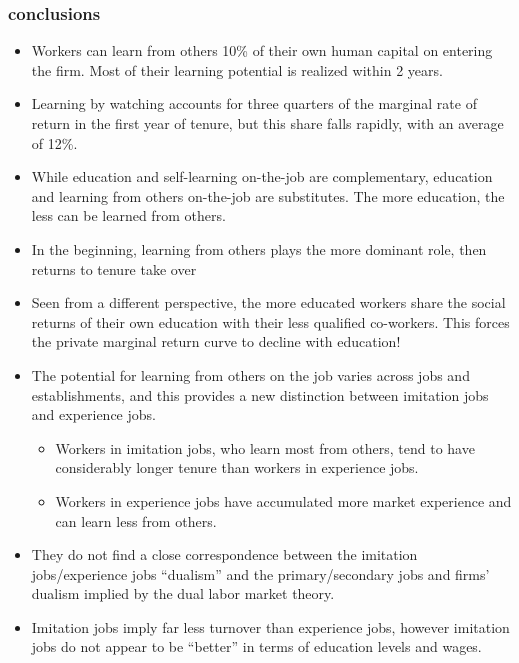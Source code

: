 \documentclass[12pt,a4paper]{article}
\begin{document}
  \subsubsection{conclusions} %
  \label{ssub:conclusions}
  \begin{itemize}
    \item Workers can learn from others 10\% of their own human capital on entering the firm. 
          Most of their learning potential is realized within 2 years.
    \item Learning by watching accounts for three quarters of the marginal rate of return in 
          the first year of tenure, but this share falls rapidly, with an average of 12\%.
    \item While education and self-learning on-the-job are complementary, education and learning from
          others on-the-job are substitutes. The more education, the less can be learned from others.
    \item In the beginning, learning from others plays the more dominant role, then returns to tenure take over
    \item Seen from a different perspective, the more educated workers share the social returns of 
          their own education with their less qualified co-workers. This forces the private marginal 
          return curve to decline with education!
    \item The potential for learning from others on the job varies across jobs and establishments, 
          and this provides a new distinction between imitation jobs and experience jobs.
      \begin{itemize}
        \item Workers in imitation jobs, who learn most from others, tend to have considerably longer 
              tenure than workers in experience jobs.
        \item Workers in experience jobs have accumulated more market experience and can learn less from 
              others.
      \end{itemize}
    \item They do not find a close correspondence between the imitation jobs/experience jobs “dualism” 
          and the primary/secondary jobs and firms’ dualism implied by the dual labor market theory.
    \item Imitation jobs imply far less turnover than experience jobs, however imitation jobs do not appear 
          to be “better” in terms of education levels and wages.
  \end{itemize}
\end{document}
